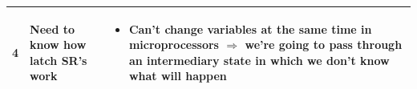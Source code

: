 \documentclass[a4paper,12pt]{article}
\begin{document}
\begin{tabular}{|C{0.7cm}|C{8cm}|C{8cm}|}
        \\

        \hline

        4
        &
        Need to know how latch SR's work    
        &
        \begin{itemize}[label=\(\rightarrow\)]
            \item Can't change variables at the same time in microprocessors $\Rightarrow$ we're going to pass through an intermediary state in which we don't know what will happen 
        \end{itemize} 
        \\

        \hline

    \end{tabular}


\noindent\hspace*{-1.5cm}
\end{document}
